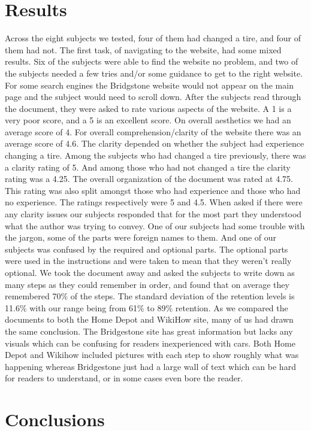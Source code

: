 \documentclass[12pt,A4paper]{article}
\begin{document}
	\section{Results}
	Across the eight subjects we tested, four of them had changed a tire, and four of them had not. The first task, of navigating to the website, had some mixed results. Six of the subjects were able to find the website no problem, and two of the subjects needed a few tries and/or some guidance to get to the right website. For some search engines the Bridgstone website would not appear on the main page and the subject would need to scroll down. After the subjects read through the document, they were asked to rate various aspects of the website. A 1 is a very poor score, and a 5 is an excellent score. On overall aesthetics we had an average score of 4. For overall comprehension/clarity of the website there was an average score of 4.6. The clarity depended on whether the subject had experience changing a tire. Among the subjects who had changed a tire previously, there was a clarity rating of 5. And among those who had not changed a tire the clarity rating was a 4.25. The overall organization of the document was rated at 4.75. This rating was also split amongst those who had experience and those who had no experience. The ratings respectively were 5 and 4.5. When asked if there were any clarity issues our subjects responded that for the most part they understood what the author was trying to convey. One of our subjects had some trouble with the jargon, some of the parts were foreign names to them. And one of our subjects was confused by the required and optional parts. The optional parts were used in the instructions and were taken to mean that they weren’t really optional. We took the document away and asked the subjects to write down as many steps as they could remember in order, and found that on average they remembered 70\% of the steps. The standard deviation of the retention levels is 11.6\% with our range being from 61\% to 89\% retention. As we compared the documents to both the Home Depot and WikiHow site, many of us had drawn the same conclusion. The Bridgestone site has great information but lacks any visuals which can be confusing for readers inexperienced with cars. Both Home Depot and Wikihow included pictures with each step to show roughly what was happening whereas Bridgestone just had a large wall of text which can be hard for readers to understand, or in some cases even bore the reader.

	\section{Conclusions}
\end{document}
